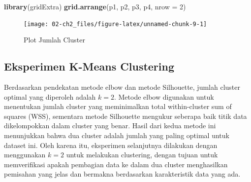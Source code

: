\documentclass[
  oneside]{book}
\newenvironment{Shaded}{\begin{snugshade}}{\end{snugshade}}
\newcommand{\AttributeTok}[1]{\textcolor[rgb]{0.13,0.29,0.53}{#1}}
\newcommand{\DecValTok}[1]{\textcolor[rgb]{0.00,0.00,0.81}{#1}}
\newcommand{\FunctionTok}[1]{\textcolor[rgb]{0.13,0.29,0.53}{\textbf{#1}}}
\newcommand{\NormalTok}[1]{#1}
\begin{document}
\begin{Shaded}
\begin{Highlighting}[]
\FunctionTok{library}\NormalTok{(gridExtra)}
\FunctionTok{grid.arrange}\NormalTok{(p1, p2, p3, p4, }\AttributeTok{nrow =} \DecValTok{2}\NormalTok{)}
\end{Highlighting}
\end{Shaded}

\begin{figure}[h]

{\centering \texttt{[image: 02-ch2\_files/figure-latex/unnamed-chunk-9-1]} 

}

\caption{Plot Jumlah Cluster}\label{fig:unnamed-chunk-9}
\end{figure}

\subsection*{Eksperimen K-Means Clustering}\label{eksperimen-k-means-clustering}

Berdasarkan pendekatan metode elbow dan metode Silhouette, jumlah cluster optimal yang diperoleh adalah \(k=2\). Metode elbow digunakan untuk menentukan jumlah cluster yang meminimalkan total within-cluster sum of squares (WSS), sementara metode Silhouette mengukur seberapa baik titik data dikelompokkan dalam cluster yang benar. Hasil dari kedua metode ini menunjukkan bahwa dua cluster adalah jumlah yang paling optimal untuk dataset ini. Oleh karena itu, eksperimen selanjutnya dilakukan dengan menggunakan \(k=2\) untuk melakukan clustering, dengan tujuan untuk memverifikasi apakah pembagian data ke dalam dua cluster menghasilkan pemisahan yang jelas dan bermakna berdasarkan karakteristik data yang ada.
\end{document}
